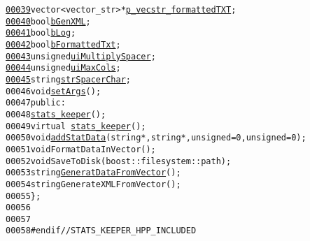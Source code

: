 \begin{footnotesize}
\begin{alltt}
\hypertarget{stats__keeper_8hpp_source_l00039}{}\hyperlink{classstats__keeper_ace46f580da108c5ddbef12d0733f4569}{00039}         vector<vector\_str> *\hyperlink{classstats__keeper_ace46f580da108c5ddbef12d0733f4569}{p_vecstr_formattedTXT}; 
\hypertarget{stats__keeper_8hpp_source_l00040}{}\hyperlink{classstats__keeper_a575bbfaa39e0f4d816d9229bc5d19795}{00040}         \textcolor{keywordtype}{bool} \hyperlink{classstats__keeper_a575bbfaa39e0f4d816d9229bc5d19795}{bGenXML}; 
\hypertarget{stats__keeper_8hpp_source_l00041}{}\hyperlink{classstats__keeper_a9d490ff7931f71f3cc8f925b8a7cdd8b}{00041}         \textcolor{keywordtype}{bool} \hyperlink{classstats__keeper_a9d490ff7931f71f3cc8f925b8a7cdd8b}{bLog}; 
\hypertarget{stats__keeper_8hpp_source_l00042}{}\hyperlink{classstats__keeper_a1e4fed8a069f534f85c5bc0b4054bbe6}{00042}         \textcolor{keywordtype}{bool} \hyperlink{classstats__keeper_a1e4fed8a069f534f85c5bc0b4054bbe6}{bFormattedTxt}; 
\hypertarget{stats__keeper_8hpp_source_l00043}{}\hyperlink{classstats__keeper_a77ee69cc8b6a80296c69b8af4de678f1}{00043}         \textcolor{keywordtype}{unsigned} \hyperlink{classstats__keeper_a77ee69cc8b6a80296c69b8af4de678f1}{uiMultiplySpacer}; 
\hypertarget{stats__keeper_8hpp_source_l00044}{}\hyperlink{classstats__keeper_ac5ad6cbbee0763290d1569ee7ff70b29}{00044}         \textcolor{keywordtype}{unsigned} \hyperlink{classstats__keeper_ac5ad6cbbee0763290d1569ee7ff70b29}{uiMaxCols}; 
\hypertarget{stats__keeper_8hpp_source_l00045}{}\hyperlink{classstats__keeper_acd8f177a6ee5df7bb623685fdf8b7c3c}{00045}         \textcolor{keywordtype}{string} \hyperlink{classstats__keeper_acd8f177a6ee5df7bb623685fdf8b7c3c}{strSpacerChar}; 
00046         \textcolor{keywordtype}{void} \hyperlink{classstats__keeper_af5b6f86db5cbfae21c4055aa498ee426}{setArgs}();
00047     \textcolor{keyword}{public}:
00048         \hyperlink{classstats__keeper_aaae9b4375bd4436758125c29f3d90d8f}{stats_keeper}();
00049         \textcolor{keyword}{virtual} ~\hyperlink{classstats__keeper}{stats_keeper}();
00050         \textcolor{keywordtype}{void} \hyperlink{classstats__keeper_a3a642d07e6a5e05f2a32b5698b3233d5}{addStatData}(\textcolor{keywordtype}{string} *,\textcolor{keywordtype}{string}*,\textcolor{keywordtype}{unsigned} =0,\textcolor{keywordtype}{unsigned} =0);
00051         \textcolor{keywordtype}{void} FormatDataInVector();
00052         \textcolor{keywordtype}{void} SaveToDisk(boost::filesystem::path);
00053         \textcolor{keywordtype}{string} \hyperlink{classstats__keeper_ab10c9697298961d0411df74d6759b63f}{GeneratDataFromVector}();
00054         \textcolor{keywordtype}{string} GenerateXMLFromVector();
00055 \};
00056 
00057 
00058 \textcolor{preprocessor}{#endif // STATS\_KEEPER\_HPP\_INCLUDED}
\end{alltt}\end{footnotesize}
